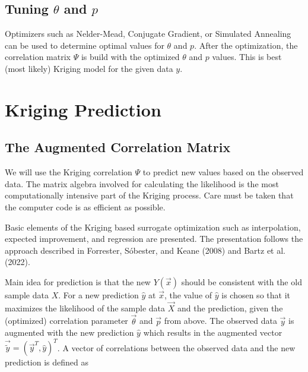 \documentclass[
  letterpaper,
  DIV=11,
  numbers=noendperiod]{scrreprt}
\begin{document}
\subsection{\texorpdfstring{Tuning \(\theta\) and
\(p\)}{Tuning \textbackslash theta and p}}\label{tuning-theta-and-p}

Optimizers such as Nelder-Mead, Conjugate Gradient, or Simulated
Annealing can be used to determine optimal values for \(\theta\) and
\(p\). After the optimization, the correlation matrix \(\Psi\) is build
with the optimized \(\theta\) and \(p\) values. This is best (most
likely) Kriging model for the given data \(y\).

\section{Kriging Prediction}\label{kriging-prediction}

\subsection{The Augmented Correlation
Matrix}\label{the-augmented-correlation-matrix}

We will use the Kriging correlation \(\Psi\) to predict new values based
on the observed data. The matrix algebra involved for calculating the
likelihood is the most computationally intensive part of the Kriging
process. Care must be taken that the computer code is as efficient as
possible.

Basic elements of the Kriging based surrogate optimization such as
interpolation, expected improvement, and regression are presented. The
presentation follows the approach described in Forrester, Sóbester, and
Keane (2008) and Bartz et al. (2022).

Main idea for prediction is that the new \(Y(\vec{x})\) should be
consistent with the old sample data \(X\). For a new prediction
\(\hat{y}\) at \(\vec{x}\), the value of \(\hat{y}\) is chosen so that
it maximizes the likelihood of the sample data \(\vec{X}\) and the
prediction, given the (optimized) correlation parameter \(\vec{\theta}\)
and \(\vec{p}\) from above. The observed data \(\vec{y}\) is augmented
with the new prediction \(\hat{y}\) which results in the augmented
vector \(\vec{\tilde{y}} = ( \vec{y}^T, \hat{y})^T\). A vector of
correlations between the observed data and the new prediction is defined
as
\end{document}
